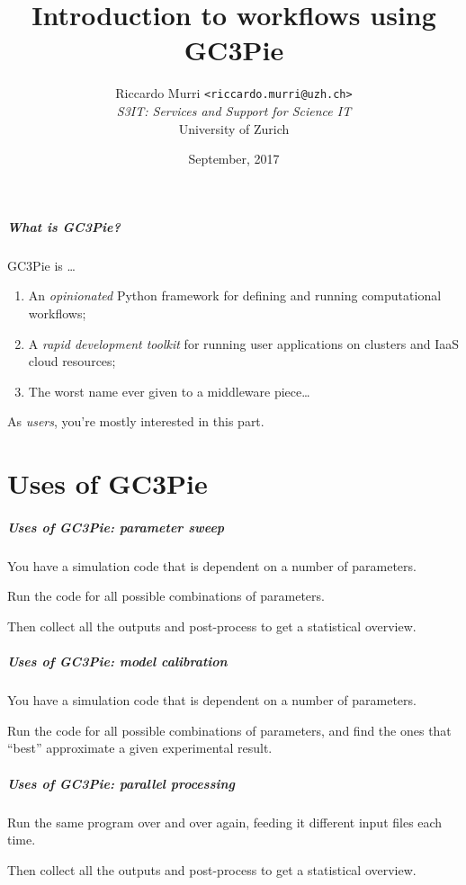 \documentclass[english,serif,mathserif,xcolor=pdftex,dvipsnames,table]{beamer}
\title[10. Workflows]{%
  Introduction to workflows
  using GC3Pie
}
\author[R.~Murri]{%
  Riccardo Murri \texttt{<riccardo.murri@uzh.ch>}
  \\
  {\em S3IT: Services and Support for Science IT}
  \\
  University of Zurich
}
\date{September, 2017}
\begin{document}
\maketitle

\begin{frame}
  \frametitle{What is GC3Pie?}
  GC3Pie is \ldots
  \begin{enumerate}
  \item An \emph{opinionated} Python framework for defining and running computational workflows;
  \item \alert<2>{A \emph{rapid development toolkit} for running user applications on clusters and IaaS cloud resources;}
  \item The worst name ever given to a middleware piece\ldots
  \end{enumerate}

  \+
  As \emph{users}, \alert<2>{you're mostly interested in this part.}
\end{frame}


\part{Uses of GC3Pie}

\begin{frame}[fragile]
  \frametitle{Uses of GC3Pie: parameter sweep}

  You have a simulation code that is dependent on a number of parameters.

  \+
  Run the code for all possible combinations of parameters.

  \+
  Then collect all the outputs and post-process to get a
  statistical overview.
\end{frame}


\begin{frame}[fragile]
  \frametitle{Uses of GC3Pie: model calibration}

  You have a simulation code that is dependent on a number of parameters.

  \+
  Run the code for all possible combinations of parameters, and
  find the ones that ``best'' approximate a given experimental result.
\end{frame}


\begin{frame}[fragile]
  \frametitle{Uses of GC3Pie: parallel processing}

  Run the same program over and over again,
  feeding it different input files each time.

  \+
  Then collect all the outputs and post-process to get a
  statistical overview.
\end{frame}
\end{document}
